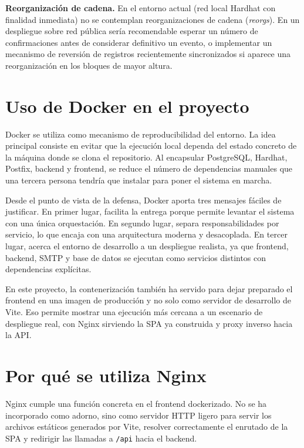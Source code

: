 \documentclass[11pt, a4paper]{article}
\begin{document}
\textbf{Reorganización de cadena.} En el entorno actual (red local Hardhat con finalidad inmediata) no se contemplan reorganizaciones de cadena (\textit{reorgs}). En un despliegue sobre red pública sería recomendable esperar un número de confirmaciones antes de considerar definitivo un evento, o implementar un mecanismo de reversión de registros recientemente sincronizados si aparece una reorganización en los bloques de mayor altura.

\section{Uso de Docker en el proyecto}

Docker se utiliza como mecanismo de reproducibilidad del entorno. La idea principal consiste en evitar que la ejecución local dependa del estado concreto de la máquina donde se clona el repositorio. Al encapsular PostgreSQL, Hardhat, Postfix, backend y frontend, se reduce el número de dependencias manuales que una tercera persona tendría que instalar para poner el sistema en marcha.

Desde el punto de vista de la defensa, Docker aporta tres mensajes fáciles de justificar. En primer lugar, facilita la entrega porque permite levantar el sistema con una única orquestación. En segundo lugar, separa responsabilidades por servicio, lo que encaja con una arquitectura moderna y desacoplada. En tercer lugar, acerca el entorno de desarrollo a un despliegue realista, ya que frontend, backend, SMTP y base de datos se ejecutan como servicios distintos con dependencias explícitas.

En este proyecto, la contenerización también ha servido para dejar preparado el frontend en una imagen de producción y no solo como servidor de desarrollo de Vite. Eso permite mostrar una ejecución más cercana a un escenario de despliegue real, con Nginx sirviendo la SPA ya construida y proxy inverso hacia la API.

\section{Por qué se utiliza Nginx}

Nginx cumple una función concreta en el frontend dockerizado. No se ha incorporado como adorno, sino como servidor HTTP ligero para servir los archivos estáticos generados por Vite, resolver correctamente el enrutado de la SPA y redirigir las llamadas a \texttt{/api} hacia el backend.
\end{document}
